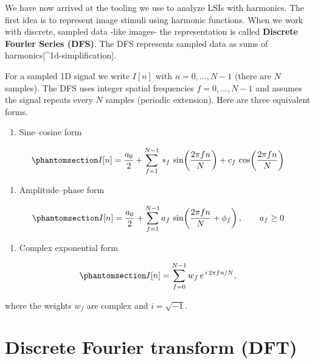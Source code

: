 \documentclass[
  letterpaper,
]{book}
\providecommand{\tightlist}{%
  \setlength{\itemsep}{0pt}\setlength{\parskip}{0pt}}\usepackage{longtable,booktabs,array}
\begin{document}
We have now arrived at the tooling we use to analyze LSIs with
harmonics. The first idea is to represent image stimuli using harmonic
functions. When we work with discrete, sampled data -like images- the
representation is called \textbf{Discrete Fourier Series (DFS)}. The DFS
represents sampled data as sums of harmonics{[}\^{}1d-simplification{]}.

For a sampled 1D signal we write \(I[n]\) with \(n = 0,\ldots,N-1\)
(there are \(N\) samples). The DFS uses integer spatial frequencies
\(f = 0,\ldots,N-1\) and assumes the signal repeats every \(N\) samples
(periodic extension). Here are three equivalent forms.

\begin{enumerate}
\def\labelenumi{\arabic{enumi}.}
\tightlist
\item
  Sine--cosine form
\end{enumerate}

\begin{equation}\phantomsection\label{eq-fourier-series}{
I[n] = \frac{a_0}{2} + \sum_{f=1}^{N-1} \, s_f \,\sin\!\left(\frac{2 \pi f n}{N}\right) + c_f \,\cos\!\left(\frac{2 \pi f n}{N}\right)
}\end{equation}

\begin{enumerate}
\def\labelenumi{\arabic{enumi}.}
\setcounter{enumi}{1}
\tightlist
\item
  Amplitude--phase form
\end{enumerate}

\begin{equation}\phantomsection\label{eq-fourier-series-phase}{
I[n] = \frac{a_0}{2} + \sum_{f=1}^{N-1} a_f \,\sin\!\left(\frac{2 \pi f n}{N} + \phi_f\right),
\qquad a_f \ge 0
}\end{equation}

\begin{enumerate}
\def\labelenumi{\arabic{enumi}.}
\setcounter{enumi}{2}
\tightlist
\item
  Complex exponential form
\end{enumerate}

\begin{equation}\phantomsection\label{eq-fourier-series-complex}{
I[n] = \sum_{f=0}^{N-1} w_f \, e^{\,i \, 2 \pi f n / N},
}\end{equation}

where the weights \(w_f\) are complex and \(i = \sqrt{-1}\).

\section{Discrete Fourier transform (DFT)}\label{sec-dft-defined}
\end{document}
